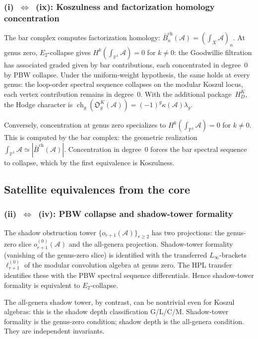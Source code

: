 \documentclass[11pt,reqno]{amsart}
\theoremstyle{definition}
\theoremstyle{remark}
\newcommand{\cA}{\mathcal{A}}
\newcommand{\barBch}{\bar{B}^{\mathrm{ch}}}
\newcommand{\bP}{\mathbb{P}}
\newcommand{\Etwo}{E_2}
\newcommand{\Linfty}{L_\infty}
\numberwithin{equation}{section}
\begin{document}
\subsubsection*{\textup{(i)}~$\Leftrightarrow$~\textup{(ix):}
Koszulness and factorization homology concentration}

The bar complex computes factorization homology:
$\barBch_n(\cA) = (\int_X \cA)_n$. At genus zero,
$\Etwo$-collapse gives
$H^k(\int_{\bP^1}\cA) = 0$ for $k \neq 0$: the Goodwillie
filtration has associated graded given by bar contributions,
each concentrated in degree~$0$ by PBW collapse.
Under the uniform-weight hypothesis, the same holds at every
genus: the loop-order spectral sequence collapses on the
modular Koszul locus, each vertex contribution remains in
degree~$0$.  With the additional package~$H_D^K$, the Hodge character
is $\operatorname{ch}_g(\mathfrak O_g^K(\cA))
=(-1)^g\kappa(\cA)\lambda_g$.

Conversely, concentration at genus zero specializes to
$H^k(\int_{\bP^1}\cA) = 0$ for $k \neq 0$. This is computed
by the bar complex: the geometric realization
$\int_{\bP^1}\cA \simeq |\barBch(\cA)|$. Concentration in
degree~$0$ forces the bar spectral sequence to collapse, which
by the first equivalence is Koszulness.

\subsection{Satellite equivalences from the core}

\subsubsection*{\textup{(ii)}~$\Leftrightarrow$~\textup{(iv):}
PBW collapse and shadow-tower formality}

The shadow obstruction tower $\{o_{r+1}(\cA)\}_{r \geq 2}$
has two projections: the genus-zero slice
$o_{r+1}^{(0)}(\cA)$ and the all-genera projection. Shadow-tower
formality (vanishing of the genus-zero slice) is identified with the
transferred $\Linfty$-brackets $\ell_{r+1}^{(0)}$ of the modular
convolution algebra at genus zero. The HPL transfer identifies
these with the PBW spectral sequence differentials.
Hence shadow-tower formality is equivalent to $\Etwo$-collapse.

The all-genera shadow tower, by contrast, can be nontrivial even for
Koszul algebras: this is the shadow depth classification G/L/C/M.
Shadow-tower formality is the genus-zero condition; shadow depth
is the all-genera condition. They are independent invariants.
\end{document}
